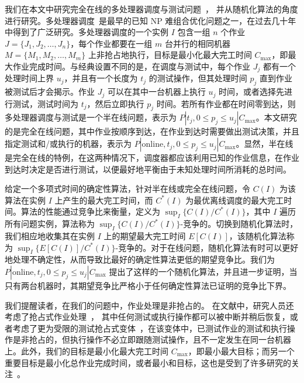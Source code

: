 我们在本文中研究完全在线的多处理器调度与测试问题~\cite{durr2018scheduling,durr2020adversarial,albers2021explorable,albers2021scheduling}，
并从随机化算法的角度进行研究。多处理器调度~\cite{garey1979computers}是最早的已知 NP 难组合优化问题之一，在过去几十年中得到了广泛研究。多处理器调度的一个实例 \( I \) 包含一组 \( n \) 个作业 \( J = \{J_1, J_2, \dots, J_n\} \)，每个作业都要在一组 \( m \) 台并行的相同机器 \( M = \{M_1, M_2, \dots, M_m\} \) 上非抢占地执行，目标是最小化最大完工时间 \( C_{\text{max}} \)，即最大作业完成时间。与经典设置不同的是，在调度与测试中，每个作业 \( J_j \) 都有一个处理时间上界 \( u_j \)，并且有一个长度为 \( t_j \) 的测试操作，但其处理时间 \( p_j \) 直到作业被测试后才会揭示。作业 \( J_j \) 可以在其中一台机器上执行 \( u_j \) 时间，或者选择先进行测试，测试时间为 \( t_j \)，然后立即执行 \( p_j \) 时间。若所有作业都在时间零到达，则多处理器调度与测试是一个半在线问题，表示为 \( P | t_j, 0 \leq p_j \leq u_j | C_{\text{max}} \)。本文研究的是完全在线问题，其中作业按顺序到达，在作业到达时需要做出测试决策，并且指定测试和/或执行的机器，表示为 \( P | \text{online}, t_j, 0 \leq p_j \leq u_j | C_{\text{max}} \)。显然，半在线是完全在线的特例，在这两种情况下，调度器都应该利用已知的作业信息，在作业到达时决定是否进行测试，以便最好地平衡由于未知处理时间所消耗的总时间。

给定一个多项式时间的确定性算法，针对半在线或完全在线问题，令 \( C(I) \) 为该算法在实例 \( I \) 上产生的最大完工时间，而 \( C^*(I) \) 为最优离线调度的最大完工时间。算法的性能通过竞争比来衡量，定义为 \( \sup_I \{ C(I) / C^*(I) \} \)，其中 \( I \) 遍历所有问题实例，算法称为 \( \sup_I \{ C(I) / C^*(I) \} \)-竞争的。切换到随机化算法时，我们相应地收集其在实例 \( I \) 上的期望最大完工时间 \( E[C(I)] \)，该随机化算法称为 \( \sup_I \{ E[C(I)] / C^*(I) \} \)-竞争的。对于在线问题，随机化算法有时可以更好地处理不确定性，从而导致比最好的确定性算法更低的期望竞争比。我们为 \( P | \text{online}, t_j, 0 \leq p_j \leq u_j | C_{\text{max}} \) 提出了这样的一个随机化算法，并且进一步证明，当只有两台机器时，其期望竞争比严格小于任何确定性算法已证明的竞争比下界。

我们提醒读者，在我们的问题中，作业处理是非抢占的。
在文献中，研究人员还考虑了抢占式作业处理~\cite{durr2018scheduling,durr2020adversarial,albers2021explorable,albers2021scheduling}，
其中任何测试或执行操作都可以被中断并稍后恢复，或者考虑了更为受限的测试抢占式变体~\cite{albers2021scheduling}，在该变体中，已测试作业的测试和执行操作是非抢占的，但执行操作不必立即跟随测试操作，且不一定发生在同一台机器上。此外，我们的目标是最小化最大完工时间 \( C_{\text{max}} \)，即最小最大目标；而另一个重要目标是最小化总作业完成时间，或者最小和目标，这也是受到了许多研究的关注~\cite{durr2018scheduling,durr2020adversarial,albers2021scheduling}。

